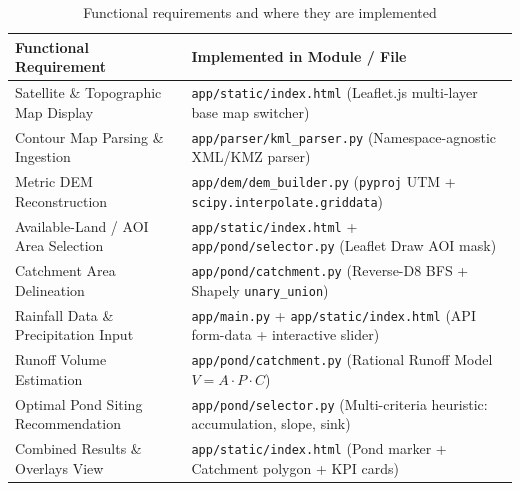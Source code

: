 \documentclass[manuscript,screen,review]{acmart}
\begin{document}
\begin{table}[h]
  \centering
  \caption{Functional requirements and where they are implemented}
  \label{tab:requirements}
  \small
  \begin{tabularx}{\linewidth}{p{6.5cm}X}
    \toprule
    \textbf{Functional Requirement} & \textbf{Implemented in Module / File} \\
    \midrule
    Satellite \& Topographic Map Display & \texttt{app/static/index.html} (Leaflet.js multi-layer base map switcher) \\
    Contour Map Parsing \& Ingestion & \texttt{app/parser/kml\_parser.py} (Namespace-agnostic XML/KMZ parser) \\
    Metric DEM Reconstruction & \texttt{app/dem/dem\_builder.py} (\texttt{pyproj} UTM + \texttt{scipy.interpolate.griddata}) \\
    Available-Land / AOI Area Selection & \texttt{app/static/index.html} + \texttt{app/pond/selector.py} (Leaflet Draw AOI mask) \\
    Catchment Area Delineation & \texttt{app/pond/catchment.py} (Reverse-D8 BFS + Shapely \texttt{unary\_union}) \\
    Rainfall Data \& Precipitation Input & \texttt{app/main.py} + \texttt{app/static/index.html} (API form-data + interactive slider) \\
    Runoff Volume Estimation & \texttt{app/pond/catchment.py} (Rational Runoff Model $V = A \cdot P \cdot C$) \\
    Optimal Pond Siting Recommendation & \texttt{app/pond/selector.py} (Multi-criteria heuristic: accumulation, slope, sink) \\
    Combined Results \& Overlays View & \texttt{app/static/index.html} (Pond marker + Catchment polygon + KPI cards) \\
    \bottomrule
  \end{tabularx}
\end{table}
\end{document}
